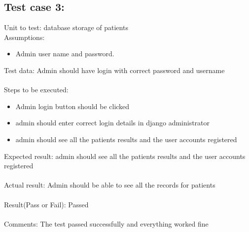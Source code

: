 \documentclass[oneside,12pt]{Classes/VTU}
\begin{document}
	\subsection{Test case 3:}
	Unit to test: database storage of patients\\
	Assumptions:\\
	\begin{itemize}
		\item Admin user name and password.
	\end{itemize}
	Test data: Admin should have login with correct password and username\\
	\\
	Steps to be executed:\\
	\begin{itemize}
		\item Admin login button should be clicked
		\item admin should enter correct login details in django administrator
		\item admin should see all the patients results and the user accounts registered
	\end{itemize}
	Expected result:  admin should see all the patients results and the user accounts registered\\
	\\
	Actual result: Admin should be able to see all the records for patients\\
	\\
	Result(Pass or Fail): Passed\\
	\\
	Comments: The test passed successfully and everything worked fine
	
\end{document}
